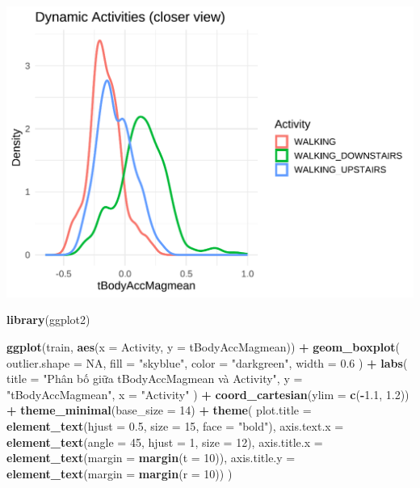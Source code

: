 \documentclass[
]{article}
\newenvironment{Shaded}{\begin{snugshade}}{\end{snugshade}}
\newcommand{\AttributeTok}[1]{\textcolor[rgb]{0.13,0.29,0.53}{#1}}
\newcommand{\ConstantTok}[1]{\textcolor[rgb]{0.56,0.35,0.01}{#1}}
\newcommand{\DecValTok}[1]{\textcolor[rgb]{0.00,0.00,0.81}{#1}}
\newcommand{\FloatTok}[1]{\textcolor[rgb]{0.00,0.00,0.81}{#1}}
\newcommand{\FunctionTok}[1]{\textcolor[rgb]{0.13,0.29,0.53}{\textbf{#1}}}
\newcommand{\NormalTok}[1]{#1}
\newcommand{\SpecialCharTok}[1]{\textcolor[rgb]{0.81,0.36,0.00}{\textbf{#1}}}
\newcommand{\StringTok}[1]{\textcolor[rgb]{0.31,0.60,0.02}{#1}}
\begin{document}
\includegraphics{report_files/figure-latex/unnamed-chunk-18-1.pdf}

\begin{Shaded}
\begin{Highlighting}[]
\FunctionTok{library}\NormalTok{(ggplot2)}

\FunctionTok{ggplot}\NormalTok{(train, }\FunctionTok{aes}\NormalTok{(}\AttributeTok{x =}\NormalTok{ Activity, }\AttributeTok{y =}\NormalTok{ tBodyAccMagmean)) }\SpecialCharTok{+}
  \FunctionTok{geom\_boxplot}\NormalTok{(}
    \AttributeTok{outlier.shape =} \ConstantTok{NA}\NormalTok{,}
    \AttributeTok{fill =} \StringTok{"skyblue"}\NormalTok{,}
    \AttributeTok{color =} \StringTok{"darkgreen"}\NormalTok{,}
    \AttributeTok{width =} \FloatTok{0.6}
\NormalTok{  ) }\SpecialCharTok{+}
  \FunctionTok{labs}\NormalTok{(}
    \AttributeTok{title =} \StringTok{"Phân bố giữa tBodyAccMagmean và Activity"}\NormalTok{,}
    \AttributeTok{y =} \StringTok{"tBodyAccMagmean"}\NormalTok{,}
    \AttributeTok{x =} \StringTok{"Activity"}
\NormalTok{  ) }\SpecialCharTok{+}
  \FunctionTok{coord\_cartesian}\NormalTok{(}\AttributeTok{ylim =} \FunctionTok{c}\NormalTok{(}\SpecialCharTok{{-}}\FloatTok{1.1}\NormalTok{, }\FloatTok{1.2}\NormalTok{)) }\SpecialCharTok{+} 
  \FunctionTok{theme\_minimal}\NormalTok{(}\AttributeTok{base\_size =} \DecValTok{14}\NormalTok{) }\SpecialCharTok{+}
  \FunctionTok{theme}\NormalTok{(}
    \AttributeTok{plot.title =} \FunctionTok{element\_text}\NormalTok{(}\AttributeTok{hjust =} \FloatTok{0.5}\NormalTok{, }\AttributeTok{size =} \DecValTok{15}\NormalTok{, }\AttributeTok{face =} \StringTok{"bold"}\NormalTok{),}
    \AttributeTok{axis.text.x =} \FunctionTok{element\_text}\NormalTok{(}\AttributeTok{angle =} \DecValTok{45}\NormalTok{, }\AttributeTok{hjust =} \DecValTok{1}\NormalTok{, }\AttributeTok{size =} \DecValTok{12}\NormalTok{),}
    \AttributeTok{axis.title.x =} \FunctionTok{element\_text}\NormalTok{(}\AttributeTok{margin =} \FunctionTok{margin}\NormalTok{(}\AttributeTok{t =} \DecValTok{10}\NormalTok{)),}
    \AttributeTok{axis.title.y =} \FunctionTok{element\_text}\NormalTok{(}\AttributeTok{margin =} \FunctionTok{margin}\NormalTok{(}\AttributeTok{r =} \DecValTok{10}\NormalTok{))}
\NormalTok{  )}
\end{Highlighting}
\end{Shaded}
\end{document}
